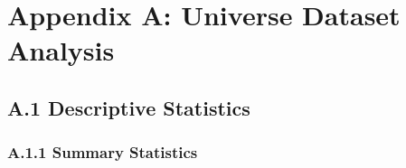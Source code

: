 %
%

\chapter{Appendix A: Universe Dataset Analysis}
\label{app:app01}

\section{A.1 Descriptive Statistics}


\subsection{A.1.1 Summary Statistics}



